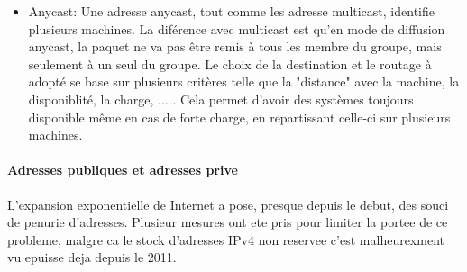 \begin{itemize}
Cela est fait dans le but que le routeur ralye uniquement les paquets qui sont à destination des groupes
multicast  présent dans son réseau. Il n'est en effet pas nécessaire de relayer tous les paquets de tout les groupes
multicast dans le réseau, si celui-ci ne contient aucun abonné au groupe.
Le faite d'avertir le routeur qu'il y a des machines abonné à un groupe dans le réseau permet aussi à celui-ci
de créer une route depuis l'émetteur vers son réseau qui contient des abonnés au groupe. Mais ceci fait partie du
routage des paquets par le routeur.
Il existe une plage d'adresse qui est réservé pour les adresses IP multicast. Lorsqu'il y a un besoin de contacter
plusieurs machines simplement, une adresse peut être utilisé depuis cette plage.
Elle s'étend de l'adresse 224.0.0.0 à l'adresse 239.255.255.255 et à pour masque 240.0.0.0 . Cela laisse donc 2\^28 adresses
multicast différente.
Au sein de cette plage d'adresse il existe une catégorisation:
//TODO
\begin{itemize}
\item
\end{itemize}
Ce mode permet de limiter le nombre de paquet envoyé pour joindre plusieurs machine et il est très utilisé dans le cas
de diffusion en streaming ou de videoconférence, où il faut faire pervenir une même information à plusieurs autres
participants.
\item Anycast: Une adresse anycast, tout comme les adresse multicast, identifie plusieurs machines. La diférence avec multicast
est qu'en mode de diffusion anycast, la paquet ne va pas être remis à tous les membre du groupe, mais seulement à un seul du groupe.
Le choix de la destination et le routage à adopté se base sur plusieurs critères telle que la "distance" avec la machine, la disponiblité,
la charge, ... . Cela permet d'avoir des systèmes toujours disponible même en cas de forte charge, en repartissant celle-ci sur
plusieurs machines.
\end{itemize}



\paragraph{Adresses publiques et adresses prive}
L'expansion exponentielle de Internet a pose, presque depuis le debut, des
souci de penurie d'adresses. Plusieur mesures ont ete pris pour limiter la
portee de ce probleme, malgre ca le stock d'adresses IPv4 non reservee
c'est malheurexment vu epuisse deja depuis le 2011.

